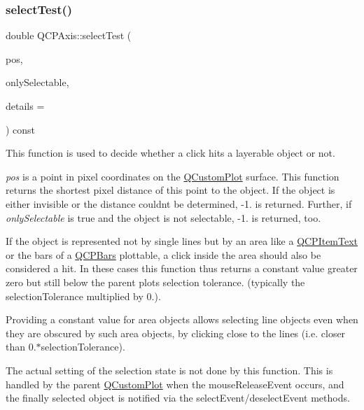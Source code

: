 \subsubsection{\texorpdfstring{select\+Test()}{selectTest()}\hspace{0.1cm}{\footnotesize\ttfamily [1/2]}}
{\footnotesize\ttfamily double Q\+C\+P\+Axis\+::select\+Test (\begin{DoxyParamCaption}\item[{const Q\+PointF \&}]{pos,  }\item[{bool}]{only\+Selectable,  }\item[{Q\+Variant $\ast$}]{details = {} }\end{DoxyParamCaption}) const\hspace{0.3cm}{\ttfamily [virtual]}}

This function is used to decide whether a click hits a layerable object or not.

{\itshape pos} is a point in pixel coordinates on the \hyperlink{class_q_custom_plot}{Q\+Custom\+Plot} surface. This function returns the shortest pixel distance of this point to the object. If the object is either invisible or the distance couldn\textquotesingle{}t be determined, -\/1. is returned. Further, if {\itshape only\+Selectable} is true and the object is not selectable, -\/1. is returned, too.

If the object is represented not by single lines but by an area like a \hyperlink{class_q_c_p_item_text}{Q\+C\+P\+Item\+Text} or the bars of a \hyperlink{class_q_c_p_bars}{Q\+C\+P\+Bars} plottable, a click inside the area should also be considered a hit. In these cases this function thus returns a constant value greater zero but still below the parent plot\textquotesingle{}s selection tolerance. (typically the selection\+Tolerance multiplied by 0.).

Providing a constant value for area objects allows selecting line objects even when they are obscured by such area objects, by clicking close to the lines (i.\+e. closer than 0.$\ast$selection\+Tolerance).

The actual setting of the selection state is not done by this function. This is handled by the parent \hyperlink{class_q_custom_plot}{Q\+Custom\+Plot} when the mouse\+Release\+Event occurs, and the finally selected object is notified via the select\+Event/deselect\+Event methods.

